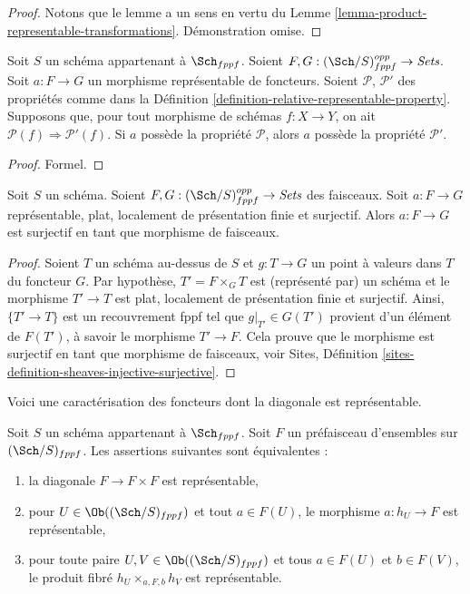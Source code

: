 \begin{proof}
Notons que le lemme a un sens en vertu du
Lemme \ref{lemma-product-representable-transformations}.
Démonstration omise.
\end{proof}

\begin{lemma}
\label{lemma-representable-transformations-property-implication}
Soit $S$ un schéma appartenant à $\Sch_{fppf}$.
Soient $F, G : (\Sch/S)_{fppf}^{opp} \to \textit{Sets}$.
Soit $a : F \to G$ un morphisme représentable de foncteurs.
Soient $\mathcal{P}$, $\mathcal{P}'$ des propriétés comme dans la
Définition \ref{definition-relative-representable-property}.
Supposons que, pour tout morphisme de schémas $f : X \to Y$,
on ait $\mathcal{P}(f) \Rightarrow \mathcal{P}'(f)$.
Si $a$ possède la propriété $\mathcal{P}$, alors
$a$ possède la propriété $\mathcal{P}'$.
\end{lemma}

\begin{proof}
Formel.
\end{proof}

\begin{lemma}
\label{lemma-surjective-flat-locally-finite-presentation}
Soit $S$ un schéma.
Soient $F, G : (\Sch/S)_{fppf}^{opp} \to \textit{Sets}$ des faisceaux.
Soit $a : F \to G$ représentable, plat,
localement de présentation finie et surjectif.
Alors $a : F \to G$ est surjectif en tant que morphisme de faisceaux.
\end{lemma}

\begin{proof}
Soient $T$ un schéma au-dessus de $S$ et $g : T \to G$ un point à valeurs dans $T$ du foncteur
$G$. Par hypothèse, $T' = F \times_G T$ est (représenté par) un schéma et
le morphisme $T' \to T$ est plat, localement de présentation finie et
surjectif. Ainsi, $\{T' \to T\}$ est un recouvrement fppf tel
que $g|_{T'} \in G(T')$ provient d'un élément de $F(T')$, à savoir
le morphisme $T' \to F$. Cela prouve que le morphisme est surjectif en tant que
morphisme de faisceaux, voir
Sites, Définition \ref{sites-definition-sheaves-injective-surjective}.
\end{proof}

\noindent
Voici une caractérisation des foncteurs dont la
diagonale est représentable.

\begin{lemma}
\label{lemma-representable-diagonal}
Soit $S$ un schéma appartenant à $\Sch_{fppf}$.
Soit $F$ un préfaisceau d'ensembles sur $(\Sch/S)_{fppf}$.
Les assertions suivantes sont équivalentes :
\begin{enumerate}
\item la diagonale $F \to F \times F$ est représentable,
\item pour $U \in \Ob((\Sch/S)_{fppf})$ et tout $a \in F(U)$,
le morphisme $a : h_U \to F$ est représentable,
\item pour toute paire $U, V \in \Ob((\Sch/S)_{fppf})$
et tous $a \in F(U)$ et $b \in F(V)$, le produit fibré
$h_U \times_{a, F, b} h_V$ est représentable.
\end{enumerate}
\end{lemma}

